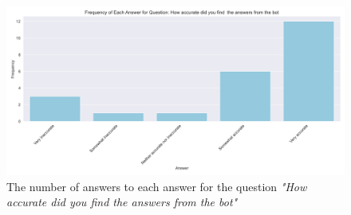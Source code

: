 \begin{figure}[H]
    \centering
    \includegraphics[width=\textwidth]{results/plots/assets/feedback-01-frequency-of-answer-for-question-ead094.png}
    \caption{The number of answers to each answer for the question \textit{"How accurate did you find  the answers from the bot"}}
    \label{fig:feedback_01_frequency_of_answer_for_question_ead094}
\end{figure}